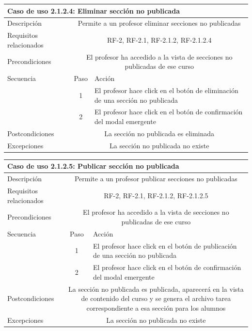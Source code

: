 \hspace{3cm}

\begin{adjustwidth}{-2cm}{}
\begin{tabular}[H]{l c l}
\toprule 
\multicolumn{3}{l}{\textbf{Caso de uso 2.1.2.4: Eliminar sección no publicada}}\\
\midrule
Descripción & \multicolumn{2}{p{10cm}}{Permite a un profesor eliminar secciones no publicadas}\\
\midrule
Requisitos relacionados & \multicolumn{2}{p{10cm}}{RF-2, RF-2.1, RF-2.1.2, RF-2.1.2.4}\\
\midrule
Precondiciones & \multicolumn{2}{p{10cm}}{El profesor ha accedido a la vista de secciones no publicadas de ese curso}\\
\midrule
Secuencia & Paso & Acción \\
\cmidrule{2-3}
         & 1 &  \multicolumn{1}{p{8cm}}{El profesor hace click en el botón de eliminación de una sección no publicada}\\
         & 2 &  \multicolumn{1}{p{8cm}}{El profesor hace click en el botón de confirmación del modal emergente}\\
\midrule
Postcondiciones & \multicolumn{2}{p{10cm}}{La sección no publicada es eliminada}\\
\midrule
Excepciones & \multicolumn{2}{p{10cm}}{La sección no publicada no existe}\\
\bottomrule 
\end{tabular}

\hspace{3cm}

\begin{tabular}[H]{l c l}
\toprule 
\multicolumn{3}{l}{\textbf{Caso de uso 2.1.2.5: Publicar sección no publicada}}\\
\midrule
Descripción & \multicolumn{2}{p{10cm}}{Permite a un profesor publicar secciones no publicadas}\\
\midrule
Requisitos relacionados & \multicolumn{2}{p{10cm}}{RF-2, RF-2.1, RF-2.1.2, RF-2.1.2.5}\\
\midrule
Precondiciones & \multicolumn{2}{p{10cm}}{El profesor ha accedido a la vista de secciones no publicadas de ese curso}\\
\midrule
Secuencia & Paso & Acción \\
\cmidrule{2-3}
         & 1 &  \multicolumn{1}{p{8cm}}{El profesor hace click en el botón de publicación de una sección no publicada}\\
         & 2 &  \multicolumn{1}{p{8cm}}{El profesor hace click en el botón de confirmación del modal emergente}\\

\midrule
Postcondiciones & \multicolumn{2}{p{10cm}}{La sección no publicada es publicada, aparecerá en la vista de contenido del curso y se genera el archivo tarea correspondiente a esa sección para los alumnos}\\
\midrule
Excepciones & \multicolumn{2}{p{10cm}}{La sección no publicada no existe}\\
\bottomrule 
\end{tabular}
\end{adjustwidth}

